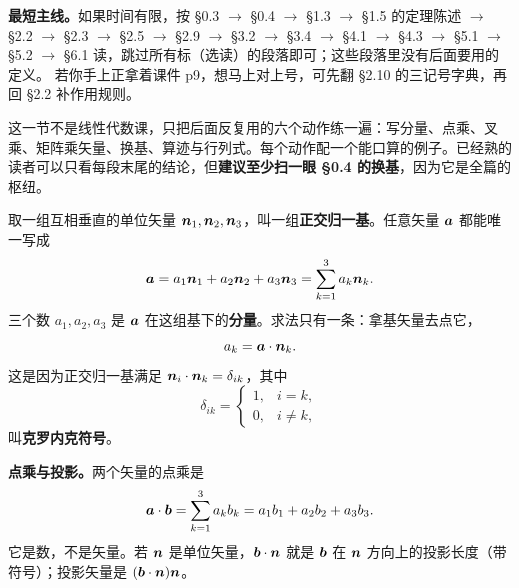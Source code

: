 \documentclass[11pt]{ctexart}
\let\orighdr\hdr
\renewcommand{\hdr}[2]{\par\needspace{5\baselineskip}\orighdr{#1}{#2}}
\let\origsubhdr\subhdr
\renewcommand{\subhdr}[1]{\par\needspace{3\baselineskip}\origsubhdr{#1}}
\begin{document}

\textbf{最短主线。}如果时间有限，按 §0.3 $\to$ §0.4 $\to$ §1.3 $\to$ §1.5 的定理陈述 $\to$ §2.2 $\to$ §2.3 $\to$ §2.5 $\to$ §2.9 $\to$ §3.2 $\to$ §3.4 $\to$ §4.1 $\to$ §4.3 $\to$ §5.1 $\to$ §5.2 $\to$ §6.1 读，跳过所有标（选读）的段落即可；这些段落里没有后面要用的定义。
若你手上正拿着课件 p9，想马上对上号，可先翻 §2.10 的三记号字典，再回 §2.2 补作用规则。


这一节不是线性代数课，只把后面反复用的六个动作练一遍：写分量、点乘、叉乘、矩阵乘矢量、换基、算迹与行列式。每个动作配一个能口算的例子。已经熟的读者可以只看每段末尾的结论，但\textbf{建议至少扫一眼 §0.4 的换基}，因为它是全篇的枢纽。



取一组互相垂直的单位矢量 $\boldsymbol{n}_1,\boldsymbol{n}_2,\boldsymbol{n}_3$，叫一组\textbf{正交归一基}。任意矢量 $\boldsymbol{a}$ 都能唯一写成
\[
\boldsymbol{a}=a_1\boldsymbol{n}_1+a_2\boldsymbol{n}_2+a_3\boldsymbol{n}_3=\sum_{k=1}^{3}a_k\boldsymbol{n}_k .
\]
三个数 $a_1,a_2,a_3$ 是 $\boldsymbol{a}$ 在这组基下的\textbf{分量}。求法只有一条：拿基矢量去点它，
\[
a_k=\boldsymbol{a}\cdot\boldsymbol{n}_k .
\]
这是因为正交归一基满足 $\boldsymbol{n}_i\cdot\boldsymbol{n}_k=\delta_{ik}$，其中
\[
\delta_{ik}=\begin{cases}1,&i=k,\\0,&i\ne k,\end{cases}
\]
叫\textbf{克罗内克符号}。

\textbf{点乘与投影。}两个矢量的点乘是
\[
\boldsymbol{a}\cdot\boldsymbol{b}=\sum_{k=1}^{3}a_kb_k=a_1b_1+a_2b_2+a_3b_3 .
\]
它是数，不是矢量。若 $\boldsymbol{n}$ 是单位矢量，$\boldsymbol{b}\cdot\boldsymbol{n}$ 就是 $\boldsymbol{b}$ 在 $\boldsymbol{n}$ 方向上的投影长度（带符号）；投影矢量是 $(\boldsymbol{b}\cdot\boldsymbol{n})\boldsymbol{n}$。
\end{document}
